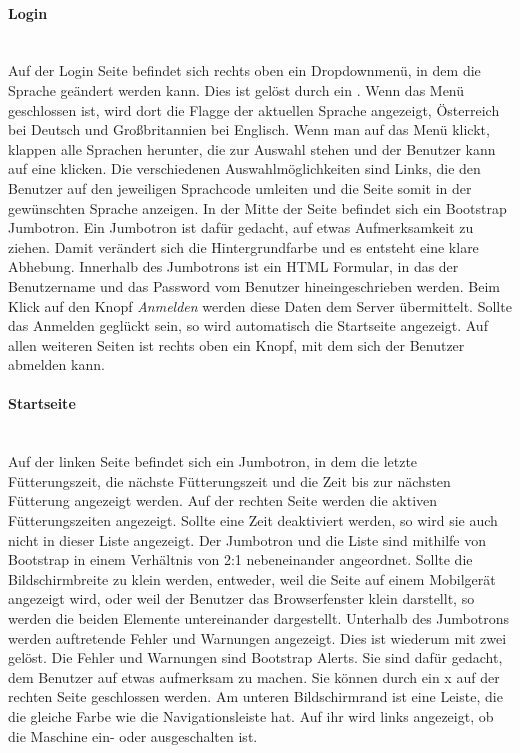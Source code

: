 \paragraph*{Login}\mbox{}\\
Auf der Login Seite befindet sich rechts oben ein Dropdownmenü, in dem die Sprache geändert werden kann. Dies ist gelöst durch ein . Wenn das Menü geschlossen ist, wird dort die Flagge der aktuellen Sprache angezeigt, Österreich bei Deutsch und Großbritannien bei Englisch. Wenn man auf das Menü klickt, klappen alle Sprachen herunter, die zur Auswahl stehen und der Benutzer kann auf eine klicken. Die verschiedenen Auswahlmöglichkeiten sind Links, die den Benutzer auf den jeweiligen Sprachcode umleiten und die Seite somit in der gewünschten Sprache anzeigen. In der Mitte der Seite befindet sich ein Bootstrap Jumbotron. Ein Jumbotron ist dafür gedacht, auf etwas Aufmerksamkeit zu ziehen. Damit verändert sich die Hintergrundfarbe und es entsteht eine klare Abhebung. Innerhalb des Jumbotrons ist ein \ac{HTML} Formular, in das der Benutzername und das Password vom Benutzer hineingeschrieben werden. Beim Klick auf den Knopf \textit{Anmelden} werden diese Daten dem Server übermittelt. Sollte das Anmelden geglückt sein, so wird automatisch die Startseite angezeigt. Auf allen weiteren Seiten ist rechts oben ein Knopf, mit dem sich der Benutzer abmelden kann.

\paragraph*{Startseite}\mbox{}\\
Auf der linken Seite befindet sich ein Jumbotron, in dem die letzte Fütterungszeit, die nächste Fütterungszeit und die Zeit bis zur nächsten Fütterung angezeigt werden. Auf der rechten Seite werden die aktiven Fütterungszeiten angezeigt. Sollte eine Zeit deaktiviert werden, so wird sie auch nicht in dieser Liste angezeigt. Der Jumbotron und die Liste sind mithilfe von Bootstrap in einem Verhältnis von 2:1 nebeneinander angeordnet. Sollte die Bildschirmbreite zu klein werden, entweder, weil die Seite auf einem Mobilgerät angezeigt wird, oder weil der Benutzer das Browserfenster klein darstellt, so werden die beiden Elemente untereinander dargestellt. Unterhalb des Jumbotrons werden auftretende Fehler und Warnungen angezeigt. Dies ist wiederum mit zwei  gelöst. Die Fehler und Warnungen sind Bootstrap Alerts. Sie sind dafür gedacht, dem Benutzer auf etwas aufmerksam zu machen. Sie können durch ein x auf der rechten Seite geschlossen werden. Am unteren Bildschirmrand ist eine Leiste, die die gleiche Farbe wie die Navigationsleiste hat. Auf ihr wird links angezeigt, ob die Maschine ein- oder ausgeschalten ist.

